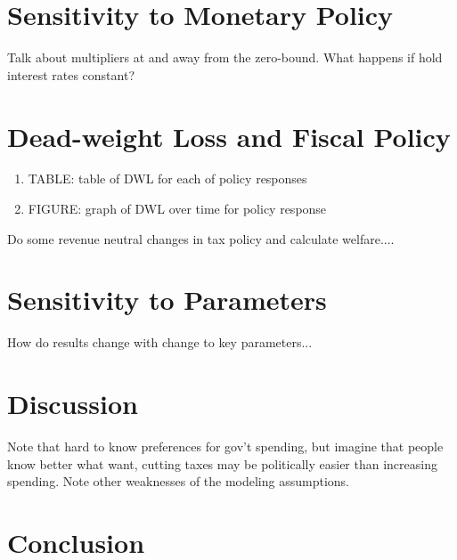 \documentclass[article,11pt,letterpaper,fleqn]{article}
\theoremstyle{definition}
\numberwithin{equation}{section}
\begin{document}
{\section{Sensitivity to Monetary Policy}

Talk about multipliers at and away from the zero-bound.  What happens if hold interest rates constant?

\section{Dead-weight Loss and Fiscal Policy}

\begin{enumerate}
\item TABLE: table of DWL for each of policy responses
\item FIGURE: graph of DWL over time for policy response
\end{enumerate}

Do some revenue neutral changes in tax policy and calculate welfare....

\section{Sensitivity to Parameters}

How do results change with change to key parameters...


\section{Discussion}

Note that hard to know preferences for gov't spending, but imagine that people know better what want, cutting taxes may be politically easier than increasing spending.  Note other weaknesses of the modeling assumptions.

\section{Conclusion}



}
\end{document}
